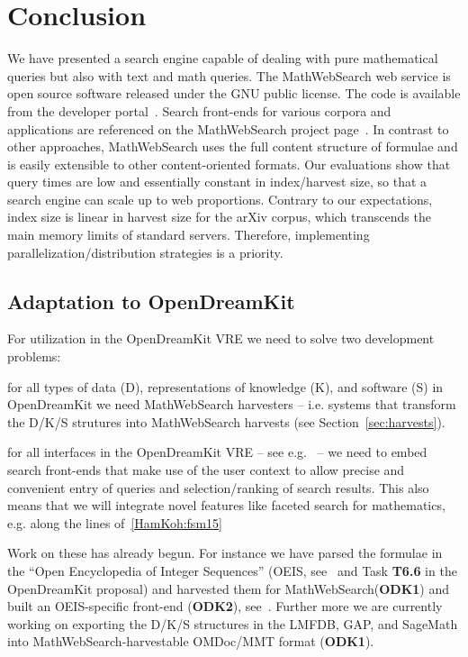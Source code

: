 \documentclass{deliverablereport}
\def\pn{OpenDreamKit\xspace}
\def\MWS{\textsf{MathWebSearch}\xspace}
\begin{document}
\section{Conclusion}\label{sec:concl}
We have presented a search engine capable of dealing with pure mathematical queries but
also with text and math queries. The \MWS web service is open source software released
under the GNU public license. The code is available from the developer
portal~\cite{MWS-git:on}. Search front-ends for various corpora and applications are
referenced on the \MWS project page~\cite{MWSProj:on}. In contrast to other
approaches, \MWS uses the full content structure of formulae and is easily
extensible to other content-oriented formats. Our evaluations show that query times are
low and essentially constant in index/harvest size, so that a search engine can scale up
to web proportions. Contrary to our expectations, index size is linear in harvest size for
the arXiv corpus, which transcends the main memory limits of standard servers. Therefore,
implementing parallelization/distribution strategies is a priority. 

\subsection*{Adaptation to \pn} For utilization in the \pn VRE we need to solve two
development problems: 
\begin{compactenum}[\bf ODK1]
\item for all types of data (D), representations of knowledge (K), and software (S) in \pn
  we need \MWS harvesters -- i.e. systems that transform the D/K/S strutures into \MWS
  harvests (see Section~\ref{sec:harvests}).
\item for all interfaces in the \pn VRE -- see e.g.~\cite{ODK-D4.2} -- we need to embed
  search front-ends that make use of the user context to allow precise and convenient
  entry of queries and selection/ranking of search results. This also means that we will
  integrate novel features like faceted search for mathematics, e.g. along the lines
  of~\ref{HamKoh:fsm15}
\end{compactenum}
Work on these has already begun. For instance we have parsed the formulae in the ``Open
Encyclopedia of Integer Sequences'' (OEIS, see~\cite{oeis} and Task \textbf{T6.6} in the
\pn proposal) and harvested them for \MWS (\textbf{ODK1}) and built an OEIS-specific
front-end (\textbf{ODK2}), see~\cite{LuzKoh:fsarfo16}. Further more we are currently
working on exporting the D/K/S structures in the LMFDB, GAP, and SageMath into
\MWS-harvestable OMDoc/MMT format (\textbf{ODK1}). 

\newpage\printbibliography
\end{document}
